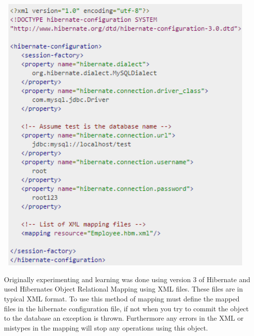 \begin{center}    
	\includegraphics[height=14cm, width=13cm]{img/hibernatesettings.png}
\end{center}

Originally experimenting and learning was done using version 3 of Hibernate and used Hibernates Object Relational Mapping using XML files. These files are in typical XML format. To use this method of mapping must define the mapped files in the hibernate configuration file, if not when you try to commit the object to the database an exception is thrown. Furthermore any errors in the XML or mistypes in the mapping will stop any operations using this object.

